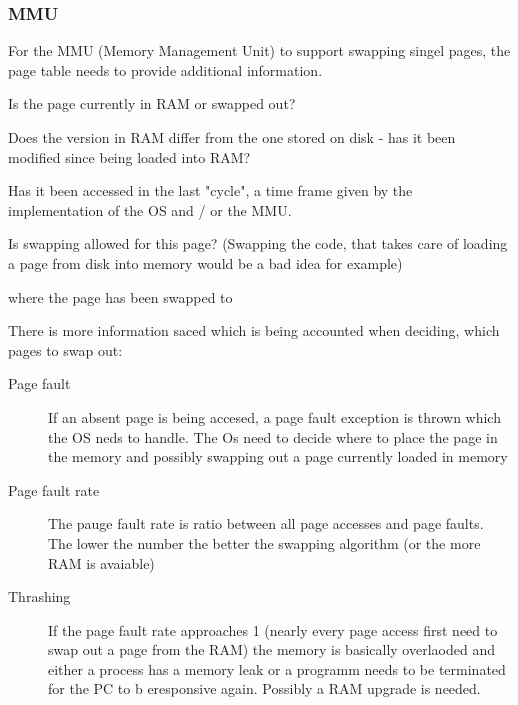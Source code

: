 \documentclass[a4paper]{scrartcl}
\begin{document}
                \subsubsection{MMU}
                    For the MMU (Memory Management Unit) to support swapping singel pages, the page table needs to provide additional information. 
                    \begin{description}
                        \item[present/absent]  Is the page currently in RAM or swapped out?
                        \item[modified] Does the version in RAM differ from the one stored on disk - has it been modified since being loaded into RAM?
                        \item[recently] Has it been accessed in the last "cycle", a time frame given by the implementation of the OS and / or the MMU.
                        \item[caching on/off] Is swapping allowed for this page? (Swapping the code, that takes care of loading a page from disk into memory would be a bad idea for example)
                        \item where the page has been swapped to
                    \end{description}
                    There is more information saced which is being accounted when deciding, which pages to swap out: 
                    \begin{description}
                        \item[Page fault] If an absent page is being accesed, a page fault exception is thrown which the OS neds to handle. The Os need to decide where to place the page in the 
                            memory and possibly swapping out a page currently loaded in memory
                        \item[Page fault rate] The pauge fault rate is ratio between all page accesses and page faults. The lower the number the better the swapping algorithm (or the more RAM is avaiable)
                        \item[Thrashing] If the page fault rate approaches 1 (nearly every page access first need to swap out a page from the RAM) the memory is  basically overlaoded and either a process
                         has a memory leak or a programm needs to be terminated for the PC to b eresponsive again. Possibly a RAM upgrade is needed.   
                    \end{description}
\end{document}
